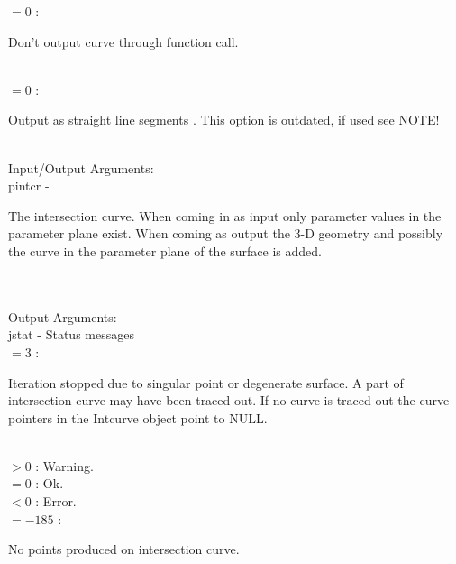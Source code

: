                     \>\>\>\>\> $= 0$ \> : \begin{minipg5}
                                            Don't output curve through
                                            function call.
                                          \end{minipg5}\\[0.3ex]
                    \>\>\>\>\> $= 0$ \> : \begin{minipg5}
                                             Output as straight line
                                             segments . This option is
                                             outdated, if used see NOTE!
                                          \end{minipg5}\\[0.8ex]
\newpagetabs
        \>Input/Output Arguments:\\
        \>\>    {\fov pintcr}\> - \>
        \begin{minipg2}
          The intersection curve. When coming in as input
          only parameter values in the parameter plane
          exist. When coming as output the 3-D geometry
          and possibly the curve in the parameter plane
          of the surface is added.
        \end{minipg2}\\[0.8ex]
\\
        \>Output Arguments:\\
        \>\>    {\fov jstat}     \> - \> Status messages\\
        \>\>\>\> $= 3$ \>\> :
                \begin{minipg5}
                  Iteration stopped due to singular
                  point or degenerate surface. A part
                  of intersection curve may have been
                  traced out. If no curve is traced out
                  the curve pointers in the Intcurve
                  object point to NULL.
                \end{minipg5}\\[0.8ex]
        \>\>\>\> $> 0$ \>\> : Warning.\\
        \>\>\>\> $= 0$ \>\> : Ok.\\
        \>\>\>\> $< 0$ \>\> : Error.\\
        \>\>\>\> $= -185$ \>\> :
        \begin{minipg5}
          No points produced on intersection curve.
        \end{minipg5}\\[0.8ex]
